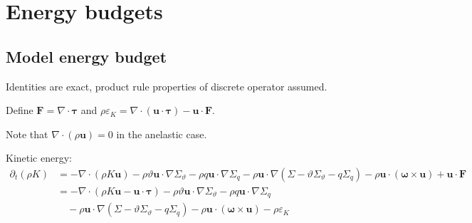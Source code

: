 \documentclass{article}
\begin{document}
\section{Energy budgets}
\subsection{Model energy budget}
Identities are exact, product rule properties of discrete operator assumed.

Define \(\mathbf{F} = \nabla\cdot \boldsymbol{\tau}\) and \(\rho \varepsilon_K = \nabla\cdot (\mathbf{u}\cdot \boldsymbol{\tau}) - \mathbf{u}\cdot \mathbf{F}\).  

Note that \(\nabla\cdot (\rho \mathbf{u}) = 0\) in the anelastic case. 

Kinetic energy:
\begin{align}
    \partial_t(\rho K)
    & = 
    - \nabla\cdot (\rho K \mathbf{u} )
    - \rho \vartheta \mathbf{u} \cdot  \nabla \Sigma_\vartheta
    - \rho q\mathbf{u} \cdot  \nabla \Sigma_q
    - \rho \mathbf{u} \cdot  \nabla (
        \Sigma 
        - \vartheta \Sigma_\vartheta
        - q \Sigma_q
        )
    - \rho \mathbf{u} \cdot (\boldsymbol{\omega }\times \mathbf{u})
    + \mathbf{u} \cdot \mathbf{F}
    \\
    & = 
    - \nabla\cdot (
        \rho K \mathbf{u}
        - \mathbf{u}\cdot \boldsymbol{\tau}
        )
    - \rho \vartheta \mathbf{u} \cdot  \nabla \Sigma_\vartheta
    - \rho q\mathbf{u} \cdot  \nabla \Sigma_q
    \nonumber
    \\
    & \quad
    - \rho \mathbf{u} \cdot  \nabla (
        \Sigma 
        - \vartheta \Sigma_\vartheta
        - q \Sigma_q
        )
    - \rho \mathbf{u} \cdot (\boldsymbol{\omega }\times \mathbf{u})
    - \rho \varepsilon_K
\end{align}
\end{document}
